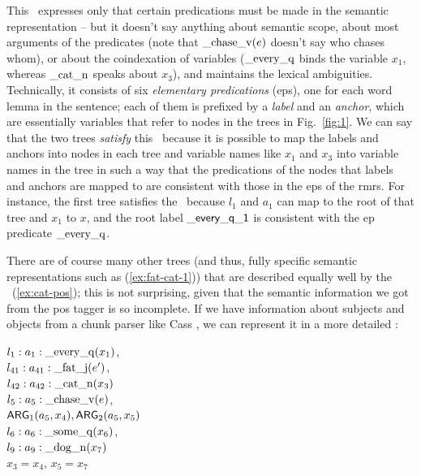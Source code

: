 This \rmrs\ expresses only that certain predications must be made in
the semantic representation -- but it doesn't say anything about
semantic scope, about most arguments of the
predicates (note that $\mathrm{\_chase\_v}(e)$ doesn't say who chases
whom), or about the coindexation of variables ($\mathrm{\_every\_q}$
binds the variable $x_1$, whereas $\mathrm{\_cat\_n}$ speaks about
$x_3$), and maintains the lexical ambiguities.  Technically, it
consists of six \emph{elementary predications} ({\sc ep}s), one for
each word lemma in the sentence; each of them is prefixed by a
\emph{label} and an \emph{anchor}, which are essentially variables
that refer to nodes in the trees in Fig.~\ref{fig:1}.  We can say that
the two trees \emph{satisfy} this \rmrs\ because it is possible to map
the labels and anchors into nodes in each tree and variable names like
$x_1$ and $x_3$ into variable names in the tree in such a way that the
predications of the nodes that labels and anchors are mapped to are 
consistent with those in the {\sc ep}s of the {\sc rmrs}.  For
instance, the first tree satisfies the \rmrs\ because $l_1$ and $a_1$
can map to the root of that tree and $x_1$ to $x$, and the root label
$\mathsf{\_every\_q\_1}$ is consistent with the {\sc ep} predicate
$\mathrm{\_every\_q}$.


There are of course many other trees (and thus, fully specific
semantic representations such as (\ref{ex:fat-cat-1})) that are
described equally well by the \rmrs\ (\ref{ex:cat-pos}); this is not
surprising, given that the semantic information we got from the {\sc
  pos} tagger is so incomplete.  If we have
information about subjects and objects from a chunk parser
like Cass \cite{abney:1996}, we can represent it in a more detailed
\rmrs:

\begin{examples}
\item 
$l_1:a_1:\mathrm{\_every\_q}(x_1)$, \\
$l_{41}:a_{41}:\mathrm{\_fat\_j}(e')$,\\
$l_{42}:a_{42}:\mathrm{\_cat\_n}(x_3)$\\
$l_5:a_5:\mathrm{\_chase\_v}(e)$, \\
\hspace*{0.1in} $\mathsf{ARG}_1(a_5,x_4),
\mathsf{ARG}_2(a_5,x_5)$\\ 
$l_6:a_6:\mathrm{\_some\_q}(x_6)$, \\
$l_9:a_9:\mathrm{\_dog\_n}(x_7)$\\
$x_3=x_4$, $x_5=x_7$
\label{ex:cat-partial-parser}
\end{examples}


